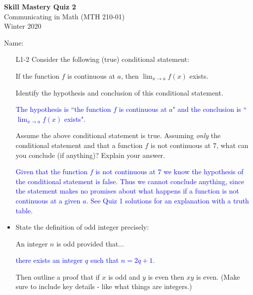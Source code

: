 \documentclass[10pt]{article}
\newcommand{\bs}{\begin{solution}}
\begin{document}
\vspace{-1.2in}
\begin{center} \textbf{\Large{Skill Mastery Quiz 2}} \\
Communicating in Math (MTH 210-01)\\
Winter 2020
\end{center}



\noindent Name: 




\begin{itemize}
	\item[L1-2] Consider the following (true) conditional statement: 
	\begin{center}
	If the function $f$ is continuous at $a$, then $\displaystyle{\lim_{x\to a} f(x)}$ exists.
\end{center}
	Identify the hypothesis and conclusion of this conditional statement.
	
	\bs\textcolor{blue}{The hypothesis is ``the function $f$ is continuous at $a$" and the conclusion is ``$\displaystyle{\lim_{x\to a} f(x)}$ exists".}\end{solution}
	\vspace{.5in}
	
	
Assume the above conditional statement is true. Assuming \emph{only} the conditional statement and that a function $f$ is not continuous at $7$, what can you conclude (if anything)?  Explain your answer.

	\bs\textcolor{blue}{Given that the function $f$ is not continuous at $7$ we know the hypothesis of the conditional statement is false. Thus we cannot conclude anything, since the statement makes no promises about what happens if a function is not continuous at a given $a$. See Quiz 1 solutions for an explanation with a truth table.}\end{solution}

\vfill



\item[L2-1] State the definition of odd integer precisely:

An integer $n$ is odd provided that...

\bs\textcolor{blue}{ there exists an integer $q$ such that $n=2q+1$.}\end{solution}

\vfill
 Then outline a proof that if $x$ is odd and $y$ is even then $xy$ is even. (Make sure to include key details - like what things are integers.)
 

\end{itemize}
\end{document}
